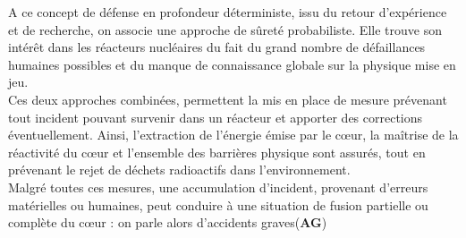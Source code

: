 \documentclass[11pt,a4paper]{scrartcl}%
\begin{document}
	A ce concept de défense en profondeur déterministe, issu du retour d'expérience et de recherche, on associe une approche de sûreté probabiliste. Elle trouve son intérêt dans les réacteurs nucléaires du fait du grand nombre de défaillances humaines possibles et du manque de connaissance globale sur la physique mise en jeu.\\
	Ces deux approches combinées, permettent la mis en place de mesure prévenant tout incident pouvant survenir dans un réacteur et apporter des corrections éventuellement. Ainsi, l'extraction de l'énergie émise par le cœur, la maîtrise de la réactivité du cœur et l'ensemble des barrières physique sont assurés, tout en prévenant le rejet de déchets radioactifs dans l'environnement.\\
	Malgré toutes ces mesures, une accumulation d'incident, provenant d'erreurs matérielles ou humaines, peut conduire à une situation de fusion partielle ou complète du cœur : on parle alors d'accidents graves(\textbf{AG}) 
\end{document}
